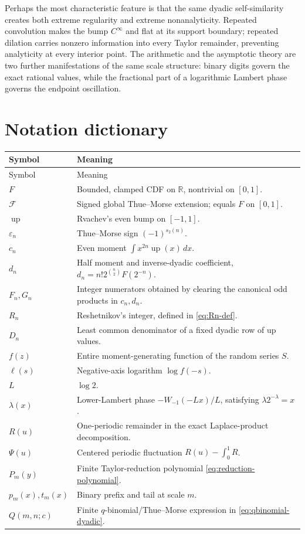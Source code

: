 \documentclass[11pt]{article}
\numberwithin{equation}{section}
\theoremstyle{definition}
\theoremstyle{remark}
\newcommand{\R}{\mathbb R}
\newcommand{\GF}{\mathcal F}
\newcommand{\upf}{\operatorname{up}}
\newcommand{\eps}{\varepsilon}
\begin{document}
Perhaps the most characteristic feature is that the same dyadic self-similarity
creates both extreme regularity and extreme nonanalyticity.  Repeated
convolution makes the bump $C^\infty$ and flat at its support boundary;
repeated dilation carries nonzero information into every Taylor remainder,
preventing analyticity at every interior point.  The arithmetic and the
asymptotic theory are two further manifestations of the same scale structure:
binary digits govern the exact rational values, while the fractional part of
a logarithmic Lambert phase governs the endpoint oscillation.

\appendix

\section{Notation dictionary}\label{app:notation}

\begin{longtable}{p{}p{}}
\toprule
Symbol & Meaning\\
\midrule
\endfirsthead
\toprule
Symbol & Meaning\\
\midrule
\endhead
$F$ & Bounded, clamped CDF on $\R$, nontrivial on $[0,1]$.\\
$\GF$ & Signed global Thue--Morse extension; equals $F$ on $[0,1]$.\\
$\upf$ & Rvachev's even bump on $[-1,1]$.\\
$\eps_n$ & Thue--Morse sign $(-1)^{s_2(n)}$.\\
$c_n$ & Even moment $\int x^{2n}\upf(x)\,dx$.\\
$d_n$ & Half moment and inverse-dyadic coefficient,
$d_n=n!2^{\binom n2}F(2^{-n})$.\\
$F_n,G_n$ & Integer numerators obtained by clearing the canonical odd
products in $c_n,d_n$.\\
$R_n$ & Reshetnikov's integer, defined in \eqref{eq:Rn-def}.\\
$D_n$ & Least common denominator of a fixed dyadic row of up values.\\
$f(z)$ & Entire moment-generating function of the random series $S$.\\
$\ell(s)$ & Negative-axis logarithm $\log f(-s)$.\\
$L$ & $\log2$.\\
$\lambda(x)$ & Lower-Lambert phase
$-W_{-1}(-Lx)/L$, satisfying $\lambda2^{-\lambda}=x$.\\
$R(u)$ & One-periodic remainder in the exact Laplace-product decomposition.\\
$\Psi(u)$ & Centered periodic fluctuation $R(u)-\int_0^1R$.\\
$P_m(y)$ & Finite Taylor-reduction polynomial \eqref{eq:reduction-polynomial}.\\
$p_m(x),t_m(x)$ & Binary prefix and tail at scale $m$.\\
$Q(m,n;c)$ & Finite $q$-binomial/Thue--Morse expression in
\eqref{eq:qbinomial-dyadic}.\\
\bottomrule
\end{longtable}
\end{document}
